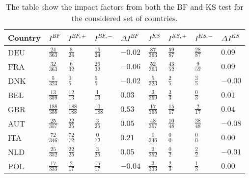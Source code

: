 \documentclass[fleqn,usenatbib,nofootinbib]{revtex4-2}
\begin{document}
\begin{appendices}
		\begin{table}[H]
			\centering
			\caption{The table show the impact factors from both the BF and KS test for the considered set of countries.}
			\label{tab:results1}
			\begin{tabular}{l l l l l l l l l }
				\hline
				Country  & $I^{BF}$ & $I^{BF,+}$ & $I^{BF,-}$ & $\Delta I^{BF}$ & $I^{KS}$ & $I^{KS,+}$ & $I^{KS,-}$ & $\Delta I^{KS}$\\
				\hline
				DEU &   $\frac{24}{363}$ &     $\frac{8}{24}$ &  $\frac{16}{24}$ &          $-0.02$ &  $\frac{87}{363}$ &  $\frac{59}{87}$ &  $\frac{28}{87}$ &           $0.09$ \\
				FRA &   $\frac{32}{363}$ &     $\frac{6}{32}$ &   $\frac{26}{32}$ &          $-0.06$ &  $\frac{52}{363}$ &  $\frac{43}{52}$ &  $\frac{9}{52}$ &           $0.09$ \\
				DNK &    $\frac{5}{323}$ &      $\frac{0}{5}$ &    $\frac{5}{5}$ &          $-0.02$ &  $\frac{5}{323}$ &   $\frac{2}{5}$ &   $\frac{3}{5}$ &            $-0.00$ \\
				BEL &   $\frac{13}{359}$ &    $\frac{12}{13}$ &   $\frac{1}{13}$ &           $0.03$ &   $\frac{3}{359}$ &    $\frac{3}{3}$ &    $\frac{0}{3}$ &            $0.01$ \\
				GBR &  $\frac{188}{355}$ &  $\frac{188}{188}$ &  $\frac{0}{188}$ &            $0.53$ &  $\frac{17}{355}$ &  $\frac{15}{17}$ &   $\frac{2}{17}$ &           $0.04$ \\
				AUT &   $\frac{25}{357}$ &    $\frac{22}{25}$ &   $\frac{3}{25}$ &           $0.05$ &  $\frac{48}{357}$ &   $\frac{10}{48}$ &  $\frac{38}{48}$ &          $-0.08$ \\
				ITA &   $\frac{72}{346}$ &    $\frac{72}{72}$ &   $\frac{0}{72}$ &           $0.21$ &   $\frac{0}{346}$ &    $\frac{0}{0}$ &    $\frac{0}{0}$ &           $0.00$ \\
				NLD &    $\frac{25}{352}$ &      $\frac{22}{25}$ &    $\frac{3}{25}$ &           $0.05$ &   $\frac{2}{352}$ &    $\frac{0}{2}$ &    $\frac{2}{2}$ &            $-0.01$ \\
				POL &   $\frac{17}{333}$ &     $\frac{2}{17}$ &  $\frac{15}{17}$ &          $-0.04$ &   $\frac{3}{333}$ &    $\frac{2}{3}$ &    $\frac{1}{3}$ &           $0.00$ \\
				\hline
			\end{tabular}
		\end{table}
		

\end{appendices}
\end{document}
